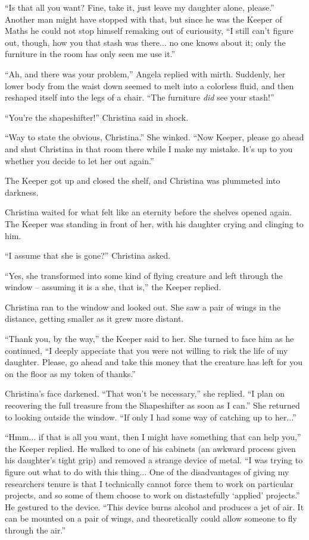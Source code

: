 \documentclass[showtrims,b6paper,draft,10pt]{memoir}
\begin{document}
``Is that all you want?  Fine,  take it, just leave my daughter alone, please.''  Another man might have stopped with that, but since he was the Keeper of Maths he could not stop himself remaking out of curiousity, ``I still can't figure out, though, how you that stash was there... no one knows about it;  only the furniture in the room has only seen me use it.''

``Ah, and there was your problem,'' Angela replied with mirth.  Suddenly, her lower body from the waist down seemed to melt into a colorless fluid, and then reshaped itself into the legs of a chair.  ``The furniture \emph{did} see your stash!''

``You're the shapeshifter!''  Christina said in shock.

``Way to state the obvious, Christina.''  She winked.  ``Now Keeper, please go ahead and shut Christina in that room there while I make my mistake.  It's up to you whether you decide to let her out again.''

The Keeper got up and closed the shelf, and Christina was plummeted into darkness.

\timeskip
Christina waited for what felt like an eternity before the shelves opened again.  The Keeper was standing in front of her, with his daughter crying and clinging to him.

``I assume that she is gone?''  Christina asked.

``Yes, she transformed into some kind of flying creature and left through the window -- assuming it is a she, that is,'' the Keeper replied.

Christina ran to the window and looked out.  She saw a pair of wings in the distance, getting smaller as it grew more distant.

``Thank you, by the way,'' the Keeper said to her.  She turned to face him as he continued, ``I deeply appeciate that you were not willing to risk the life of my daughter.  Please, go ahead and take this money that the creature has left for you on the floor as my token of thanks.''

Christina's face darkened.  ``That won't be necessary,'' she replied.  ``I plan on recovering the full treasure from the Shapeshifter as soon as I can.''  She returned to looking outside the window.  ``If only I had some way of catching up to her...''

``Hmm... if that is all you want, then I might have something that can help you,'' the Keeper replied.  He walked to one of his cabinets (an awkward process given his daughter's tight grip) and removed a strange device of metal.  ``I was trying to figure out what to do with this thing... One of the disadvantages of giving my researchers tenure is that I technically cannot force them to work on particular projects, and so some of them choose to work on distastefully `applied' projects.''  He gestured to the device.  ``This device burns alcohol and produces a jet of air.  It can be mounted on a pair of wings, and theoretically could allow someone to fly through the air.''
\end{document}
